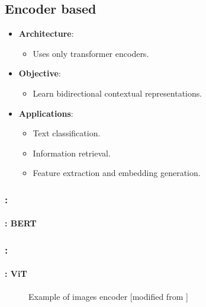 \documentclass[xcolor=table]{beamer}
\begin{document}
	\subsection{Encoder based}
	
	\begin{subsectionframe}
		\begin{itemize}
			
			\item \textbf{Architecture}:
			\begin{itemize}
				\item Uses only transformer encoders.
			\end{itemize}
			
			\item \textbf{Objective}:
			\begin{itemize}
				\item Learn bidirectional contextual representations.
			\end{itemize}
			
			\item \textbf{Applications}:
			\begin{itemize}
				\item Text classification.
				\item Information retrieval.
				\item Feature extraction and embedding generation.
			\end{itemize}
			
		\end{itemize}
	\end{subsectionframe}
	
	\begin{frame}
		\frametitle{\insertshortsubtitle: \insertsection}
		\framesubtitle{\insertsubsection: BERT \cite{devlin-etal-2019-bert}}
		
		\begin{center}
		\end{center}
		
	\end{frame}
	
	\begin{frame}
		\frametitle{\insertshortsubtitle: \insertsection}
		\framesubtitle{\insertsubsection: ViT \cite{dosovitskiy2021an}}
		
		\vspace{-6pt}
		\begin{figure}[htp!]
			\centering
			\hgraphpage[0.62\textwidth]{vit.pdf}
			\caption{Example of images encoder [modified from \cite{zhang2021dive}]}
		\end{figure}
		
	\end{frame}
	
\end{document}
